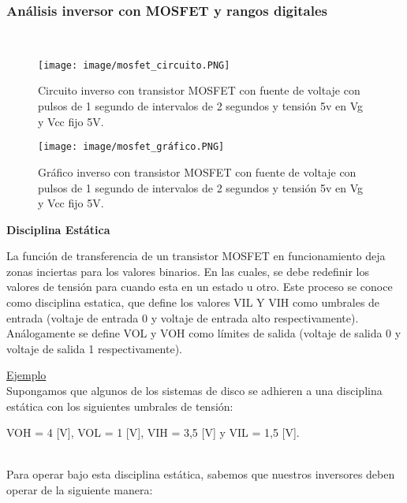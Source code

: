 \documentclass[11pt,fancy,lang=es]{elegantbook}
\begin{document}
\subsubsection{Análisis inversor con MOSFET y rangos digitales}\\
\begin{center}
    \begin{figure}
        \label{Vf}
        \texttt{[image: image/mosfet\_circuito.PNG]}
        \caption{Circuito inverso con transistor MOSFET con fuente de voltaje con pulsos de 1 segundo de intervalos de 2 segundos y tensión 5v en Vg y Vcc fijo 5V.}
        \label{fig:CM}
    \end{figure}
\end{center}
\begin{center}
    \begin{figure}
        \label{Vf}
        \texttt{[image: image/mosfet\_gráfico.PNG]}
        \caption{Gráfico inverso con transistor MOSFET con fuente de voltaje con pulsos de 1 segundo de intervalos de 2 segundos y tensión 5v en Vg y Vcc fijo 5V.}
        \label{fig:GM}
    \end{figure}
\end{center}
\begin{center}
    \textbf{Disciplina Estática}\\
\end{center}
{La función de transferencia  de un transistor MOSFET en funcionamiento deja zonas inciertas para los valores binarios. En las cuales, se debe redefinir los valores de tensión para cuando esta  en un  estado u otro. Este proceso se conoce como disciplina estatica, que define los valores VIL Y VIH como umbrales de entrada (voltaje de entrada 0 y voltaje de entrada alto respectivamente). Análogamente se define VOL y VOH como límites  de salida (voltaje de salida 0 y voltaje de salida 1 respectivamente).}

\underline{Ejemplo}\\
{Supongamos que algunos de los sistemas de disco se adhieren a una disciplina estática con los siguientes umbrales de tensión:}\\

\begin{center}
    {VOH = 4 [V], VOL = 1 [V], VIH = 3,5 [V] y VIL = 1,5 [V].}
\end{center}\\

{Para operar bajo esta disciplina estática, sabemos que nuestros
inversores deben operar de la siguiente manera:}\\
\end{document}
